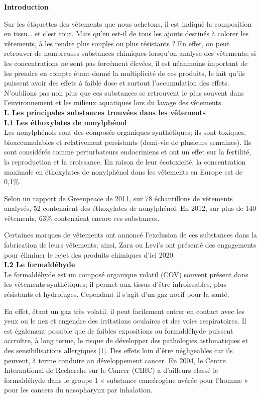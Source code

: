 \documentclass[8pt]{article}
\begin{document}
\textbf{Introduction}

Sur les étiquettes des vêtements que nous achetons, il est indiqué la composition en tissu… et c’est tout. Mais qu’en est-il de tous les ajouts destinés à colorer les vêtements, à les rendre plus souples ou plus résistants ? En effet, on peut retrouver de nombreuses substances chimiques lorsqu’on analyse des vêtements; si les concentrations ne sont pas forcément élevées, il est néanmoins important de les prendre en compte étant donné la multiplicité de ces produits, le fait qu’ils puissent avoir des effets à faible dose et surtout l’accumulation des effets. N’oublions pas non plus que ces substances se retrouvent le plus souvent dans l’environnement et les milieux aquatiques lors du lavage des vêtements.\\

\textbf{I. Les principales substances trouvées dans les vêtements}\\

\textbf{I.1 Les éthoxylates de nonylphénol}\\

Les nonylphénols sont des composés organiques synthétiques; ils sont toxiques, bioaccumulables et relativement persistants (demi-vie de plusieurs semaines). Ils sont considérés comme perturbateurs endocriniens et ont un effet sur la fertilité, la reproduction et la croissance. En raison de leur écotoxicité, la concentration maximale en éthoxylates de nonylphénol dans les vêtements en Europe est de 0,1\%.

Selon un rapport de Greenpeace de 2011, sur 78 échantillons de vêtements analysés, 52 contenaient des éthoxylates de nonylphénol. En 2012, sur plus de 140 vêtements, 63\% contenaient encore ces substances.

Certaines marques de vêtements ont annoncé l’exclusion de ces substances dans la fabrication de leurs vêtements; ainsi, Zara ou Levi’s ont présenté des engagements pour éliminer le rejet des produits chimiques d’ici 2020.\\

\textbf{I.2 Le formaldéhyde}\\

Le formaldéhyde est un composé organique volatil (COV) souvent présent dans les vêtements synthétiques; il permet aux tissus d’être infroissables, plus résistants et hydrofuges. Cependant il s’agit d’un gaz nocif pour la santé.

En effet, étant un gaz très volatil, il peut facilement entrer en contact avec les yeux ou le nez et engendre des irritations oculaires et des voies respiratoires. Il est également possible que de faibles expositions au formaldéhyde puissent accroître, à long terme, le risque de développer des pathologies asthmatiques et des sensibilisations allergiques [1]. Des effets loin d’être négligeables car ils peuvent, à terme conduire au développement cancer. En 2004, le Centre International de Recherche sur le Cancer (CIRC) a d’ailleurs classé le formaldéhyde dans le groupe 1 « substance cancérogène avérée pour l’homme » pour les cancers du nasopharynx par inhalation.
\end{document}
